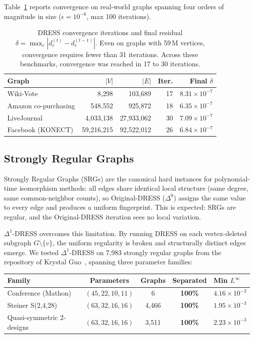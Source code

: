 \documentclass[11pt,a4paper]{article}
\begin{document}
Table~\ref{tab:convergence} reports convergence on real-world graphs spanning four orders of magnitude in size ($\epsilon = 10^{-6}$, max 100 iterations).

\begin{table}[h]
\centering
\begin{tabular}{lrrrr}
\textbf{Graph} & $|V|$ & $|E|$ & \textbf{Iter.} & \textbf{Final $\delta$} \\
\hline
Wiki-Vote              & 8{,}298       & 103{,}689       & 17 & $8.31 \times 10^{-7}$ \\
Amazon co-purchasing   & 548{,}552     & 925{,}872       & 18 & $6.35 \times 10^{-7}$ \\
LiveJournal            & 4{,}033{,}138 & 27{,}933{,}062  & 30 & $7.09 \times 10^{-7}$ \\
Facebook (KONECT)      & 59{,}216{,}215 & 92{,}522{,}012 & 26 & $6.84 \times 10^{-7}$ \\
\end{tabular}
\caption{DRESS convergence iterations and final residual $\delta = \max_e |d^{(t)}_e - d^{(t-1)}_e|$. Even on graphs with 59\,M vertices, convergence requires fewer than 31 iterations. Across these benchmarks, convergence was reached in 17 to 30 iterations.}
\label{tab:convergence}
\end{table}

\subsection{Strongly Regular Graphs}
\label{sec:srg-results}

Strongly Regular Graphs (SRGs) are the canonical hard instances for polynomial-time isomorphism methods: all edges share identical local structure (same degree, same common-neighbor counts), so Original-DRESS ($\Delta^0$) assigns the same value to every edge and produces a uniform fingerprint. This is expected: SRGs are regular, and the Original-DRESS iteration sees no local variation.

$\Delta^1$-DRESS overcomes this limitation. By running DRESS on each vertex-deleted subgraph $G \setminus \{v\}$, the uniform regularity is broken and structurally distinct edges emerge. We tested $\Delta^1$-DRESS on 7{,}983 strongly regular graphs from the repository of Krystal Guo~\cite{guo2024srg}, spanning three parameter families:

\begin{center}
\begin{tabular}{lcccl}
\textbf{Family} & \textbf{Parameters} & \textbf{Graphs} & \textbf{Separated} & \textbf{Min $L^\infty$} \\
\hline
Conference (Mathon)       & $(45,22,10,11)$ & 6     & \textbf{100\%} & $4.16 \times 10^{-3}$ \\
Steiner S(2,4,28)         & $(63,32,16,16)$ & 4{,}466 & \textbf{100\%} & $1.95 \times 10^{-3}$ \\
Quasi-symmetric 2-designs & $(63,32,16,16)$ & 3{,}511 & \textbf{100\%} & $2.23 \times 10^{-3}$ \\
\end{tabular}
\end{center}
\end{document}
